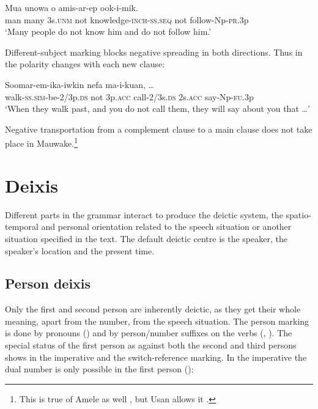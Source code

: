 \ea%
\label{ex:6:x1139}
\gll Mua  unowa  o    amis-ar-ep   ook-i-mik.\\
man  many  3s.\textsc{unm}  not  knowledge-\textsc{inch}-\textsc{ss}.\textsc{seq} not  follow-Np-\textsc{pr}.3p\\
\glt `Many people do not know him and do not follow him.'
\z

Different-subject marking blocks negative spreading in both directions. Thus in  the polarity changes with each new clause:

\ea%
\label{ex:6:x1141}
\gll Soomar-em-ika-iwkin      nefa  ma-i-kuan, {\dots}\\
walk-\textsc{ss}.\textsc{sim}-be-2/3p.\textsc{ds}  not  3p.\textsc{acc}  call-2/3s.\textsc{ds} 2s.\textsc{acc}  say-Np-\textsc{fu}.3p\\
\glt `When they walk past, and you do not call them, they will say about you that {\dots}'
\z

Negative transportation from a complement clause to a main clause does not take place in Mauwake.\footnote{This is true of Amele as well \citep[44]{Roberts1987}, but Usan allows it \citep[278--280]{Reesink1987}.} 

\section{Deixis}\label{sec:6.3}

Different parts in the grammar interact to produce the deictic system, the spatio-tem\-poral and personal orientation related to the speech situation or another situation specified in the text. The default deictic centre is the speaker, the speaker's location and the present time.  

\subsection{Person deixis} \label{sec:6.3.1}

Only the first and second person are inherently deictic, as they get their whole meaning, apart from the number, from the speech situation. The person marking is done by pronouns () and by person/number suffixes on the verbs (, ). The special status of the first person as against both the second and third persons shows in the imperative and the switch-reference marking. In the imperative the dual number is only possible in the first person  (): 

